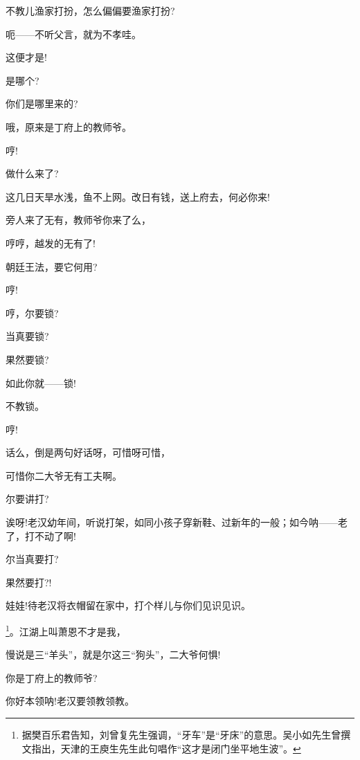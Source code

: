 {{不教儿渔家打扮，怎么偏偏要渔家打扮?}

{呃------不听父言，就为不孝哇。}

{这便才是!}

{是哪个?}

{你们是哪里来的?}

{哦，原来是丁府上的教师爷。}

{哼!}

{做什么来了?}

{这几日天旱水浅，鱼不上网。改日有钱，送上府去，何必你来!}

{旁人来了无有，教师爷你来了么，}

{哼哼，越发的无有了!}

{朝廷王法，要它何用?}

{哼!}

{哼，尔要锁?}

{当真要锁?}

{果然要锁?}

{如此你就------锁!}

{不教锁。}

{哼!}

{话么，倒是两句好话呀，可惜呀可惜，}

{可惜你二大爷无有工夫啊。}

{尔要讲打?}

{诶呀!老汉幼年间，听说打架，如同小孩子穿新鞋、过新年的一般；如今呐------老了，打不动了啊!}

{尔当真要打?}

{果然要打?!}

{娃娃!待老汉将衣帽留在家中，打个样儿与你们见识见识。}


\footnote{据樊百乐{\scriptsize 君}告知，刘曾复先生强调，``牙车''是``牙床''的意思。吴小如先生曾撰文指出，天津的王庾生先生此句唱作``这才是闭门坐平地生波''。}{。江湖上叫萧恩不才是我，}



{慢说是三``羊头''，就是尔这三``狗头''，二大爷何惧!}

{你是丁府上的教师爷?}

{你好本领呐!老汉要领教领教。}

}
